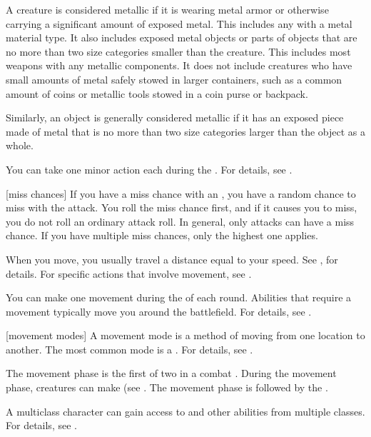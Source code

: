  A creature is considered metallic if it is wearing metal armor or otherwise carrying a significant amount of exposed metal.
This includes any  with a metal material type.
It also includes exposed metal objects or parts of objects that are no more than two size categories smaller than the creature.
This includes most weapons with any metallic components.
It does not include creatures who have small amounts of metal safely stowed in larger containers, such as a common amount of coins or metallic tools stowed in a coin purse or backpack.

Similarly, an object is generally considered metallic if it has an exposed piece made of metal that is no more than two size categories larger than the object as a whole.

 You can take one minor action each  during the .
For details, see .

[miss chances] If you have a miss chance with an , you have a random chance to miss with the attack.
You roll the miss chance first, and if it causes you to miss, you do not roll an ordinary attack roll.
In general, only  attacks can have a miss chance.
If you have multiple miss chances, only the highest one applies.

 When you move, you usually travel a distance equal to your speed.
See , for details.
For specific actions that involve movement, see .

 You can make one movement during the  of each round.
Abilities that require a movement typically move you around the battlefield.
For details, see .

[movement modes] A movement mode is a method of moving from one location to another.
The most common mode is a .
For details, see .

 The movement phase is the first of two  in a combat .
During the movement phase, creatures can make  (see .
The movement phase is followed by the .

 A multiclass character can gain access to  and other abilities from multiple classes.
For details, see .

